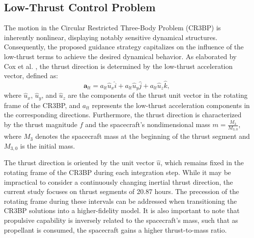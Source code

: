 \documentclass[conference]{IEEEtran}
\begin{document}
\subsection{Low-Thrust Control Problem}
The motion in the Circular Restricted Three-Body Problem (CR3BP) is inherently nonlinear, displaying notably sensitive dynamical structures. Consequently, the proposed guidance strategy capitalizes on the influence of the low-thrust terms to achieve the desired dynamical behavior. As elaborated by Cox et al. \cite{Cox201X}, the thrust direction is determined by the low-thrust acceleration vector, defined as:
\begin{equation}
\mathbf{a}_{lt} = a_{lt} \hat{u}_x \hat{i} + a_{lt} \hat{u}_y \hat{j} + a_{lt} \hat{u}_z \hat{k},
\end{equation}
where \( \hat{u}_x \), \( \hat{u}_y \), and \( \hat{u}_z \) are the components of the thrust unit vector in the rotating frame of the CR3BP, and \( a_{lt} \) represents the low-thrust acceleration components in the corresponding directions. Furthermore, the thrust direction is characterized by the thrust magnitude \( f \) and the spacecraft's nondimensional mass \( m = \frac{M_3}{M_{3,0}} \), where \( M_3 \) denotes the spacecraft mass at the beginning of the thrust segment and \( M_{3,0} \) is the initial mass.

The thrust direction is oriented by the unit vector \( \hat{u} \), which remains fixed in the rotating frame of the CR3BP during each integration step. While it may be impractical to consider a continuously changing inertial thrust direction, the current study focuses on thrust segments of 20.87 hours. The precession of the rotating frame during these intervals can be addressed when transitioning the CR3BP solutions into a higher-fidelity model. It is also important to note that propulsive capability is inversely related to the spacecraft's mass, such that as propellant is consumed, the spacecraft gains a higher thrust-to-mass ratio. 
\end{document}

